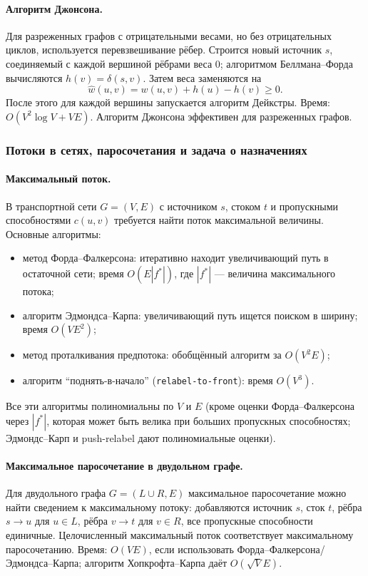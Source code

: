 \documentclass[a4paper,12pt]{article}
\begin{document}
\paragraph*{Алгоритм Джонсона.}
Для разреженных графов с отрицательными весами, но без отрицательных циклов, используется перевзвешивание рёбер. Строится новый источник \(s\), соединяемый с каждой вершиной рёбрами веса 0; алгоритмом Беллмана--Форда вычисляются \(h(v)=\delta(s,v)\). Затем веса заменяются на
\[
\widehat{w}(u,v)=w(u,v)+h(u)-h(v)\ge 0.
\]
После этого для каждой вершины запускается алгоритм Дейкстры. Время: \(O(V^2\log V+VE)\). Алгоритм Джонсона эффективен для разреженных графов.

\subsubsection*{Потоки в сетях, паросочетания и задача о назначениях}

\paragraph*{Максимальный поток.}
В транспортной сети \(G=(V,E)\) с источником \(s\), стоком \(t\) и пропускными способностями \(c(u,v)\) требуется найти поток максимальной величины. Основные алгоритмы:
\begin{itemize}
    \item метод Форда--Фалкерсона: итеративно находит увеличивающий путь в остаточной сети; время \(O(E|f^*|)\), где \(|f^*|\) — величина максимального потока;
    \item алгоритм Эдмондса--Карпа: увеличивающий путь ищется поиском в ширину; время \(O(VE^2)\);
    \item метод проталкивания предпотока: обобщённый алгоритм за \(O(V^2E)\);
    \item алгоритм ``поднять-в-начало'' (\texttt{relabel-to-front}): время \(O(V^3)\).
\end{itemize}
Все эти алгоритмы полиномиальны по \(V\) и \(E\) (кроме оценки Форда--Фалкерсона через \(|f^*|\), которая может быть велика при больших пропускных способностях; Эдмондс--Карп и push-relabel дают полиномиальные оценки).

\paragraph*{Максимальное паросочетание в двудольном графе.}
Для двудольного графа \(G=(L\cup R,E)\) максимальное паросочетание можно найти сведением к максимальному потоку: добавляются источник \(s\), сток \(t\), рёбра \(s\to u\) для \(u\in L\), рёбра \(v\to t\) для \(v\in R\), все пропускные способности единичные. Целочисленный максимальный поток соответствует максимальному паросочетанию. Время: \(O(VE)\), если использовать Форда--Фалкерсона/Эдмондса--Карпа; алгоритм Хопкрофта--Карпа даёт \(O(\sqrt{V}E)\).
\end{document}
